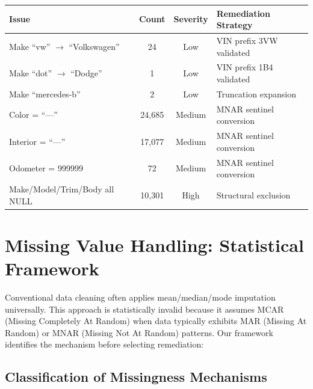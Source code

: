 \documentclass[12pt,a4paper]{article}
\begin{document}
\begin{center}
\begin{tabular}{p{3cm}ccp{5cm}}
\toprule
\textbf{Issue} & \textbf{Count} & \textbf{Severity} & \textbf{Remediation Strategy} \\
\midrule
Make ``vw'' $\rightarrow$ ``Volkswagen'' & 24 & Low & VIN prefix 3VW validated \\
Make ``dot'' $\rightarrow$ ``Dodge'' & 1 & Low & VIN prefix 1B4 validated \\
Make ``mercedes-b'' & 2 & Low & Truncation expansion \\
Color = ``---'' & 24,685 & Medium & MNAR sentinel conversion \\
Interior = ``---'' & 17,077 & Medium & MNAR sentinel conversion \\
Odometer = 999999 & 72 & Medium & MNAR sentinel conversion \\
Make/Model/Trim/Body all NULL & 10,301 & High & Structural exclusion \\
\bottomrule
\end{tabular}
\end{center}

\section{Missing Value Handling: Statistical Framework}

\begin{methodbox}
Conventional data cleaning often applies mean/median/mode imputation universally. This approach is statistically invalid because it assumes MCAR (Missing Completely At Random) when data typically exhibits MAR (Missing At Random) or MNAR (Missing Not At Random) patterns. Our framework identifies the mechanism before selecting remediation:
\end{methodbox}

\subsection{Classification of Missingness Mechanisms}
\end{document}
